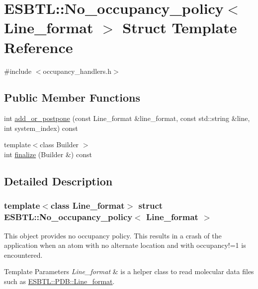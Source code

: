 \hypertarget{structESBTL_1_1No__occupancy__policy}{}\section{E\+S\+B\+TL\+:\+:No\+\_\+occupancy\+\_\+policy$<$ Line\+\_\+format $>$ Struct Template Reference}
\label{structESBTL_1_1No__occupancy__policy}


{\ttfamily \#include $<$occupancy\+\_\+handlers.\+h$>$}

\subsection*{Public Member Functions}
\begin{DoxyCompactItemize}
\item 
int \hyperlink{structESBTL_1_1No__occupancy__policy_ae3d1ae3f42e09e938787e349f43b078b}{add\+\_\+or\+\_\+postpone} (const Line\+\_\+format \&line\+\_\+format, const std\+::string \&line, int system\+\_\+index) const
\item 
{\footnotesize template$<$class Builder $>$ }\\int \hyperlink{structESBTL_1_1No__occupancy__policy_aa8cf0b10f6df8b195d50a0b120784799}{finalize} (Builder \&) const
\end{DoxyCompactItemize}


\subsection{Detailed Description}
\subsubsection*{template$<$class Line\+\_\+format$>$\newline
struct E\+S\+B\+T\+L\+::\+No\+\_\+occupancy\+\_\+policy$<$ Line\+\_\+format $>$}

This object provides no occupancy policy. This results in a crash of the application when an atom with no alternate location and with occupancy!=1 is encountered. 
\begin{DoxyTemplParams}{Template Parameters}
{\em Line\+\_\+format} & is a helper class to read molecular data files such as \hyperlink{classESBTL_1_1PDB_1_1Line__format}{E\+S\+B\+T\+L\+::\+P\+D\+B\+::\+Line\+\_\+format}. \\
\hline
\end{DoxyTemplParams}


